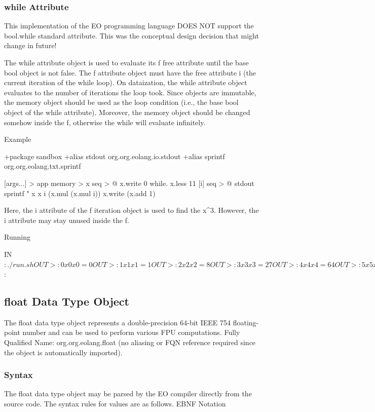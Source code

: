 \documentclass[12pt]{book}
\begin{document}
\subsubsection{while Attribute}
This implementation of the EO programming language DOES NOT support the bool.while standard attribute. This was the conceptual design decision that might change in future!

The while attribute object is used to evaluate its f free attribute until the base bool object is not false.
The f attribute object must have the free attribute i (the current iteration of the while loop).
On dataization, the while attribute object evaluates to the number of iterations the loop took.
Since objects are immutable, the memory object should be used as the loop condition (i.e., the base bool object of the while attribute). Moreover, the memory object should be changed somehow inside the f, otherwise the while will evaluate infinitely.

Example
\begin{ffcode}
+package sandbox
+alias stdout org.org.eolang.io.stdout
+alias sprintf org.org.eolang.txt.sprintf

[args...] > app
  memory > x
  seq > @
    x.write 0
    while.
      x.less 11
      [i]
        seq > @
          stdout
            sprintf "%
            x x i (x.mul (x.mul i))
          x.write (x.add 1)
          
Here, the i attribute of the f iteration object is 
used to find the x^3. However, the i attribute may 
stay unused inside the f.

Running

IN$: ./run.sh
OUT>: 0 x 0 x 0 = 0
OUT>: 1 x 1 x 1 = 1
OUT>: 2 x 2 x 2 = 8
OUT>: 3 x 3 x 3 = 27
OUT>: 4 x 4 x 4 = 64
OUT>: 5 x 5 x 5 = 125
OUT>: 6 x 6 x 6 = 216
OUT>: 7 x 7 x 7 = 343
OUT>: 8 x 8 x 8 = 512
OUT>: 9 x 9 x 9 = 729
OUT>: 10 x 10 x 10 = 1000
IN$: 
\end{ffcode}

\subsection{float Data Type Object}
The float data type object represents a double-precision 64-bit IEEE 754 floating-point number and can be used to perform various FPU computations.
Fully Qualified Name: org.org.eolang.float (no aliasing or FQN reference required since the object is automatically imported).

\subsubsection{Syntax}
The float data type object may be parsed by the EO compiler directly from the source code. The syntax rules for values are as follows.
EBNF Notation
\end{document}
